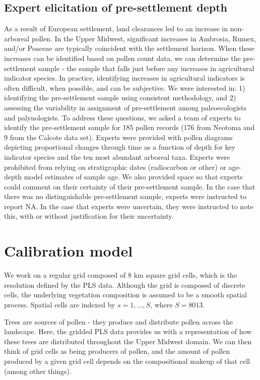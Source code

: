 \documentclass[12pt]{article}
\begin{document}
\subsection{Expert elicitation of pre-settlement depth}
As a result of European settlement, land clearances led to an increase
in non-arboreal pollen. In the Upper Midwest, significant increases in
Ambrosia, Rumex, and/or Poaceae are typically coincident with the
settlement horizon. When these increases can be identified based on
pollen count data, we can determine the pre-settlement sample - the
sample that falls just before any increases in agricultural indicator
species. In practice, identifying increases in agricultural indicators
is often difficult, when possible, and can be subjective. We were
interested in: 1) identifying the pre-settlement sample using
consistent methodology, and 2) assessing the variability in assignment
of pre-settlement among paleoecologists and palynologists. To address
these questions, we asked a team of experts to identify the
pre-settlement sample for 185 pollen records (176 from Neotoma and 9
from the Calcote data set). Experts were provided with pollen diagrams
depicting proportional changes through time as a function of depth for
key indicator species and the ten most abundant arboreal taxa. Experts
were prohibited from relying on stratigraphic dates (radiocarbon or
other) or age-depth model estimates of sample age. We also provided
space so that experts could comment on their certainty of their
pre-settlement sample. In the case that there was no distinguishable
pre-settlement sample, experts were instructed to report NA. In the
case that experts were uncertain, they were instructed to note this,
with or without justification for their uncertainty.

\section{Calibration model}

We work on a regular grid composed of 8 km square grid cells, which is
the resolution defined by the PLS data. Although the grid is composed
of discrete cells, the underlying vegetation composition is assumed to
be a smooth spatial process. Spatial cells are indexed by
$s=1,\ldots,S$, where $S=8013$.

Trees are sources of pollen - they produce and distribute pollen
across the landscape. Here, the gridded PLS data provides us with a
representation of how these trees are distributed throughout the Upper
Midwest domain. We can then think of grid cells as being producers of
pollen, and the amount of pollen produced by a given grid cell
depends on the compositional makeup of that cell (among other things). 
\end{document}
